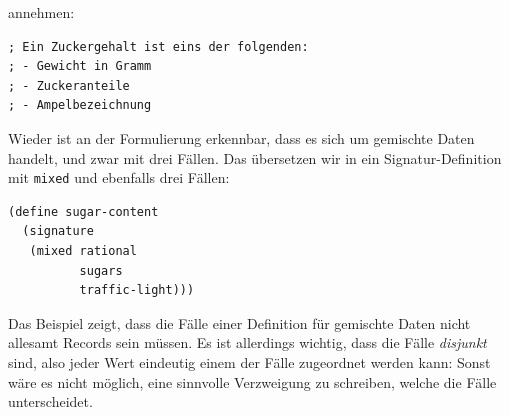 annehmen:
%
\begin{lstlisting}
; Ein Zuckergehalt ist eins der folgenden:
; - Gewicht in Gramm
; - Zuckeranteile
; - Ampelbezeichnung
\end{lstlisting}
%
Wieder ist an der Formulierung erkennbar, dass es sich um gemischte
Daten handelt, und zwar mit drei Fällen.  Das übersetzen wir in ein
Signatur-Definition mit \lstinline{mixed} und ebenfalls drei Fällen:
%
\begin{lstlisting}
(define sugar-content
  (signature
   (mixed rational
          sugars
          traffic-light)))
\end{lstlisting}
%
Das Beispiel zeigt, dass die Fälle einer Definition für gemischte Daten
nicht allesamt Records sein müssen.  Es ist allerdings wichtig, dass
die Fälle \emph{disjunkt} sind, also jeder Wert eindeutig einem der
Fälle zugeordnet werden kann: Sonst wäre es nicht möglich, eine sinnvolle
Verzweigung zu schreiben, welche die Fälle unterscheidet.

